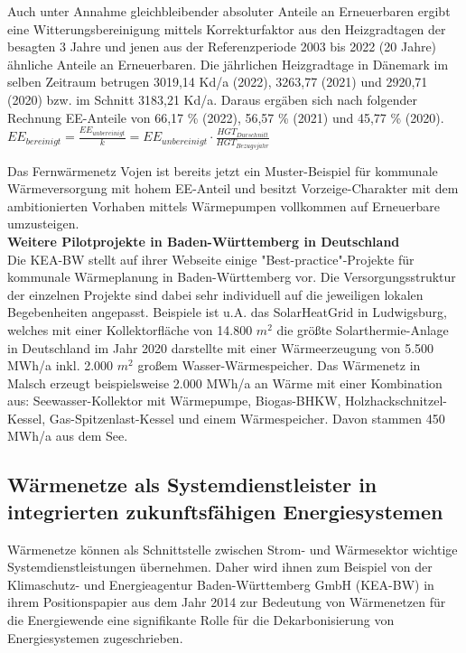 			Auch unter Annahme gleichbleibender absoluter Anteile an Erneuerbaren ergibt eine Witterungsbereinigung mittels Korrekturfaktor aus den Heizgradtagen der besagten 3 Jahre und jenen aus der Referenzperiode 2003 bis 2022 (20 Jahre) ähnliche Anteile an Erneuerbaren. Die jährlichen Heizgradtage in Dänemark im selben Zeitraum betrugen 3019,14 Kd/a (2022), 3263,77 (2021) und 2920,71 (2020) bzw. im Schnitt 3183,21 Kd/a. Daraus ergäben sich nach folgender Rechnung EE-Anteile von 66,17 \% (2022), 56,57 \% (2021) und 45,77 \% (2020). \cite{web_vojens_deklaration} \\ 
			
			$EE_{bereinigt} = \frac{EE_{unbereinigt}}{k} = EE_{unbereinigt} \cdot \frac{HGT_{Durschnitt}}{HGT_{Bezugsjahr}}$
			
			Das Fernwärmenetz Vojen ist bereits jetzt ein Muster-Beispiel für kommunale Wärmeversorgung mit hohem EE-Anteil und besitzt Vorzeige-Charakter mit dem ambitionierten Vorhaben mittels Wärmepumpen vollkommen auf Erneuerbare umzusteigen.\\
			
			\textbf{Weitere Pilotprojekte in Baden-Württemberg in Deutschland}\\
			Die KEA-BW stellt auf ihrer Webseite einige "Best-practice"-Projekte für kommunale Wärmeplanung in Baden-Württemberg vor. Die Versorgungsstruktur der einzelnen Projekte sind dabei sehr individuell auf die jeweiligen lokalen Begebenheiten angepasst. Beispiele ist u.A. das SolarHeatGrid in Ludwigsburg, welches mit einer Kollektorfläche von 14.800 $m^2$ die größte Solarthermie-Anlage in Deutschland im Jahr 2020 darstellte mit einer Wärmeerzeugung von 5.500 MWh/a inkl. 2.000 $m^2$ großem Wasser-Wärmespeicher. Das Wärmenetz in Malsch erzeugt beispielsweise 2.000 MWh/a an Wärme mit einer Kombination aus: Seewasser-Kollektor mit Wärmepumpe, Biogas-BHKW, Holzhackschnitzel-Kessel, Gas-Spitzenlast-Kessel und einem Wärmespeicher. Davon stammen 450 MWh/a aus dem See. \cite{web_kea_bw_waermewende_best_practice}
		
		\subsection{Wärmenetze als Systemdienstleister in integrierten zukunftsfähigen Energiesystemen}
		\label{sec:Grundlagen:Wärmewende_in_D:Wärmenetze_als_Systemdienstleister}
			Wärmenetze können als Schnittstelle zwischen Strom- und Wärmesektor wichtige Systemdienstleistungen übernehmen. Daher wird ihnen zum Beispiel von der Klimaschutz- und Energieagentur Baden-Württemberg GmbH (KEA-BW) in ihrem Positionspapier aus dem Jahr 2014 zur Bedeutung von Wärmenetzen für die Energiewende eine signifikante Rolle für die Dekarbonisierung von Energiesystemen zugeschrieben. \cite{kiezlen_2014_bedeutung_waermenetze_fuer_energiewende} 
			

